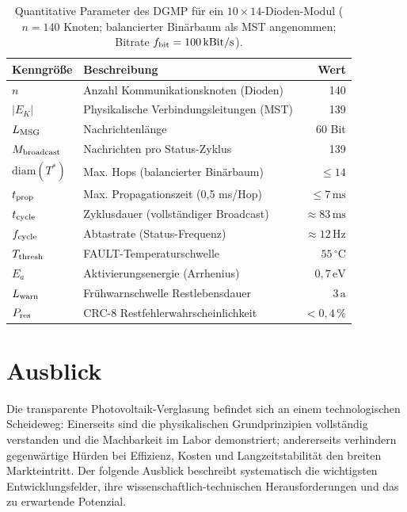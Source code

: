 ﻿\documentclass[a4paper,12pt]{article}
\theoremstyle{definition}
\theoremstyle{remark}
\begin{document}
\begin{table}[H]
  \centering
  \renewcommand{\arraystretch}{1.3}
  \caption{Quantitative Parameter des DGMP für ein $10 \times 14$-Dioden-Modul
    ($n = 140$ Knoten; balancierter Binärbaum als MST angenommen;
    Bitrate $f_{\rm bit} = 100\,\mathrm{kBit/s}$).}
  \label{tab:dgmp_zusammenfassung}
  \begin{tabularx}{\textwidth}{lXr}
    \toprule
    \textbf{Kenngröße} & \textbf{Beschreibung} & \textbf{Wert} \\
    \midrule
    $n$                 & Anzahl Kommunikationsknoten (Dioden) & 140 \\
    $|E_K|$             & Physikalische Verbindungsleitungen (MST) & 139 \\
    $L_{\rm MSG}$       & Nachrichtenlänge                          & 60 Bit \\
    $M_{\rm broadcast}$ & Nachrichten pro Status-Zyklus             & 139 \\
    $\mathrm{diam}(T^*)$& Max. Hops (balancierter Binärbaum)        & $\leq 14$ \\
    $t_{\rm prop}$      & Max. Propagationszeit (0{,}5 ms/Hop)      & $\leq 7\,\mathrm{ms}$ \\
    $t_{\rm cycle}$     & Zyklusdauer (vollständiger Broadcast)     & $\approx 83\,\mathrm{ms}$ \\
    $f_{\rm cycle}$     & Abtastrate (Status-Frequenz)              & $\approx 12\,\mathrm{Hz}$ \\
    $T_{\rm thresh}$    & FAULT-Temperaturschwelle                  & $55\,^{\circ}$C \\
    $E_a$               & Aktivierungsenergie (Arrhenius)           & $0{,}7\,\mathrm{eV}$ \\
    $L_{\rm warn}$      & Frühwarnschwelle Restlebensdauer          & $3\,\mathrm{a}$ \\
    $P_{\rm res}$       & CRC-8 Restfehlerwahrscheinlichkeit        & $< 0{,}4\,\%$ \\
    \bottomrule
  \end{tabularx}
\end{table}


\section{Ausblick}
\label{sec:ausblick}

Die transparente Photovoltaik-Verglasung befindet sich an einem
technologischen Scheideweg: Einerseits sind die physikalischen Grundprinzipien
vollständig verstanden und die Machbarkeit im Labor demonstriert; andererseits
verhindern gegenwärtige Hürden bei Effizienz, Kosten und
Langzeitstabilität den breiten Markteintritt. Der folgende Ausblick beschreibt
systematisch die wichtigsten Entwicklungsfelder, ihre wissenschaftlich-technischen
Herausforderungen und das zu erwartende Potenzial.
\end{document}
